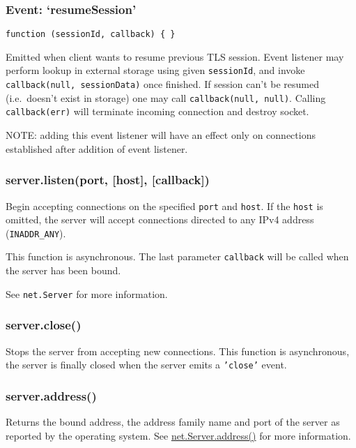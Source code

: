 \subsubsection{Event: `resumeSession'}\label{event-resumesession}

\texttt{function (sessionId, callback) \{ \}}

Emitted when client wants to resume previous TLS session. Event listener
may perform lookup in external storage using given \texttt{sessionId},
and invoke \texttt{callback(null, sessionData)} once finished. If
session can't be resumed (i.e.~doesn't exist in storage) one may call
\texttt{callback(null, null)}. Calling \texttt{callback(err)} will
terminate incoming connection and destroy socket.

NOTE: adding this event listener will have an effect only on connections
established after addition of event listener.

\subsubsection{server.listen(port, {[}host{]},
{[}callback{]})}\label{server.listenport-host-callback}

Begin accepting connections on the specified \texttt{port} and
\texttt{host}. If the \texttt{host} is omitted, the server will accept
connections directed to any IPv4 address (\texttt{INADDR\_ANY}).

This function is asynchronous. The last parameter \texttt{callback} will
be called when the server has been bound.

See \texttt{net.Server} for more information.

\subsubsection{server.close()}\label{server.close}

Stops the server from accepting new connections. This function is
asynchronous, the server is finally closed when the server emits a
\texttt{'close'} event.

\subsubsection{server.address()}\label{server.address}

Returns the bound address, the address family name and port of the
server as reported by the operating system. See
\href{net.html\#net_server_address}{net.Server.address()} for more
information.

